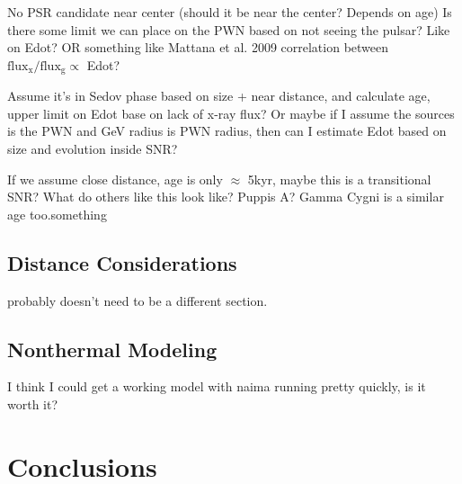 \documentclass[preprint2]{aastex}
\begin{document}
No PSR candidate near center (should it be near the center? Depends on age)
Is there some limit we can place on the PWN based on not seeing the pulsar? Like on Edot? OR something like Mattana et al. 2009 correlation between  $\mathrm{flux_x / flux_g \propto}$   Edot? 

Assume it's in Sedov phase based on size + near distance, and calculate age, upper limit on Edot base on lack of x-ray flux? Or maybe if I assume the sources is the PWN and GeV radius is PWN radius, then can I estimate Edot based on size and evolution inside  SNR?

If we assume close distance, age is only $\approx$ 5kyr, maybe this is a transitional SNR? What do others like this look like? Puppis A? Gamma Cygni is a similar age too.something 


\subsection{\label{sec:Dist}Distance Considerations}
probably doesn't need to be a different section. 
\subsection{\label{secModel}Nonthermal Modeling}
I think I could get a working model with naima running pretty quickly, is it worth it?
%
%
\section{\label{sec:Conc}Conclusions}



%
%


%

\end{document}
